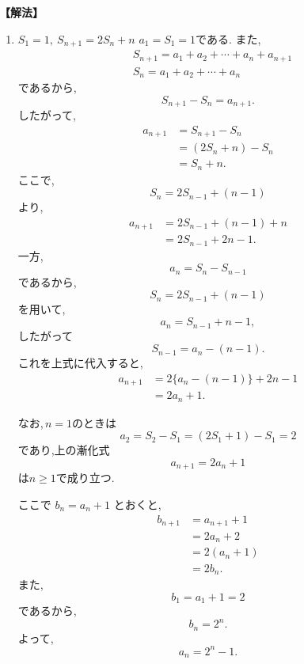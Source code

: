 \noindent\textbf{【解法】}
\begin{enumerate}[label=(\arabic*),parsep=3pt]
  \item $\displaystyle S_1=1,\ S_{n+1}=2S_n+n$
        $a_1=S_1=1$である.
        また,
        \begin{align*}
          &S_{n+1}=a_1+a_2+\cdots+a_n+a_{n+1}\\
          &S_n=a_1+a_2+\cdots+a_n
        \end{align*}
        であるから,
        \[
          S_{n+1}-S_n=a_{n+1}.
        \]
        したがって,
        \begin{align*}
          a_{n+1}
           & =S_{n+1}-S_n  \\
           & =(2S_n+n)-S_n \\
           & =S_n+n.
        \end{align*}
        ここで,
        \[
          S_n=2S_{n-1}+(n-1)
        \]
        より,
        \begin{align*}
          a_{n+1}
           & =2S_{n-1}+(n-1)+n \\
           & =2S_{n-1}+2n-1.
        \end{align*}
        一方,
        \[
          a_n=S_n-S_{n-1}
        \]
        であるから,
        \[
          S_n=2S_{n-1}+(n-1)
        \]
        を用いて,
        \[
          a_n=S_{n-1}+n-1,
        \]
        したがって
        \[
          S_{n-1}=a_n-(n-1).
        \]
        これを上式に代入すると,
        \begin{align*}
          a_{n+1}
           & =2\{a_n-(n-1)\}+2n-1 \\
           & =2a_n+1.
        \end{align*}

        なお,\,$n=1$のときは
        \[
          a_2=S_2-S_1=(2S_1+1)-S_1=2
        \]
        であり,上の漸化式
        \[
          a_{n+1}=2a_n+1
        \]
        は$n\ge1$で成り立つ.

        ここで $b_n=a_n+1$ とおくと,
        \begin{align*}
          b_{n+1}
           & =a_{n+1}+1 \\
           & =2a_n+2    \\
           & =2(a_n+1)  \\
           & =2b_n.
        \end{align*}
        また,
        \[
          b_1=a_1+1=2
        \]
        であるから,
        \[
          b_n=2^n.
        \]
        よって,
        \[
          a_n=2^n-1.
        \]
\end{enumerate}
